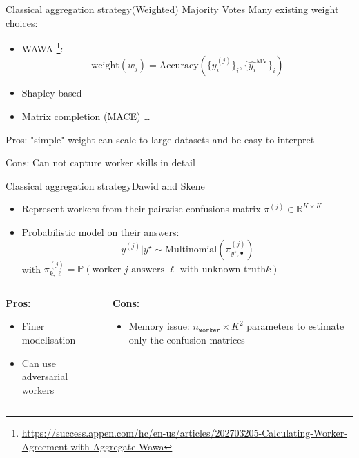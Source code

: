 \begin{frame}{Classical aggregation strategy}{(Weighted) Majority Votes}
Many existing weight choices:
\begin{itemize}[itemsep=15pt]
    \item WAWA \footnote{\url{https://success.appen.com/hc/en-us/articles/202703205-Calculating-Worker-Agreement-with-Aggregate-Wawa}}:
    \[
    \mathrm{weight}(w_j) = \mathrm{Accuracy}(\{y_i^{(j)}\}_i, \{\hat {y_i}^\mathrm{MV}\}_i)
    \]
    \item Shapley based
    \item Matrix completion (MACE) \dots
\end{itemize}
\vspace{1cm}
Pros: "simple" weight can scale to large datasets and be easy to interpret

Cons: Can not capture worker skills in detail
\end{frame}


\begin{frame}{Classical aggregation strategy}{Dawid and Skene}
\begin{itemize}
    \item Represent workers from their pairwise confusions matrix $\pi^{(j)}\in\mathbb{R}^{K\times K}$
    \item Probabilistic model on their answers:
    \[
    y^{(j)} | y^\star \sim \mathrm{Multinomial}(\pi^{(j)}_{y^\star, \bullet})
    \]
    with $\pi^{(j)}_{k,\ell}=\mathbb{P}(\text{worker }j \text{ answers }\ell \text{ with unknown truth} k)$
\end{itemize}
\vspace{.5cm}
\begin{columns}
    \begin{column}{.45\textwidth}
    \textbf{Pros:}
    \begin{itemize}
        \item Finer modelisation
        \item Can use adversarial workers
    \end{itemize}
    \end{column}
    \begin{column}{.45\textwidth}
        \textbf{Cons:}
        \begin{itemize}
            \item Memory issue: $n_{\texttt{worker}}\times K^2$ parameters to estimate only the confusion matrices
        \end{itemize}
    \end{column}
\end{columns}
\end{frame}

